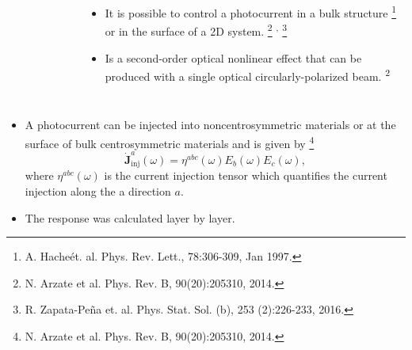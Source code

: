 \documentclass{beamer}
\begin{document}
\begin{frame}
{\begin{columns}
\begin{figure}[h!]
\begin{tikzpicture}
\end{tikzpicture}
\end{figure}



\begin{itemize}

\item 
It is possible to control a photocurrent in a bulk structure 
\footnote[frame]{\tiny A. Hache\' et. al. Phys. Rev. Lett., 78:306-309, Jan
1997.}
or in the surface of a 2D system.
\footnote[frame]{\tiny N. Arzate et al. Phys. Rev. B, 90(20):205310, 2014.}
\hspace{-1mm}\textsuperscript{,}
\footnote[frame]{\tiny R. Zapata-Pe\~na et. al. Phys. Stat. Sol. (b), 253
(2):226-233, 2016.}

\item 
Is a second-order optical nonlinear effect that can be produced with a single
optical circularly-polarized beam.\textsuperscript{ 2}


\end{itemize}


\end{columns}


}

\end{frame}



\begin{frame}


{\small

\begin{itemize}

\item 
A photocurrent can be injected into noncentrosymmetric materials or at the
surface of bulk centrosymmetric materials and is given by
\footnote[frame]{\tiny N. Arzate et al. Phys. Rev. B, 90(20):205310, 2014.}
\begin{equation*}
\mathbf{\dot{J}}^{a}_{\text{inj}}(\omega) =
\eta^{abc}(\omega)E_{b}(\omega)E_{c}(\omega), \label{eq:current}
\end{equation*}
where $\eta^{abc}(\omega)$ is the current injection tensor which quantifies the
current injection along the a direction $a$.

\item The response was calculated layer by layer.


\end{itemize}
}
\end{frame}
\end{document}
